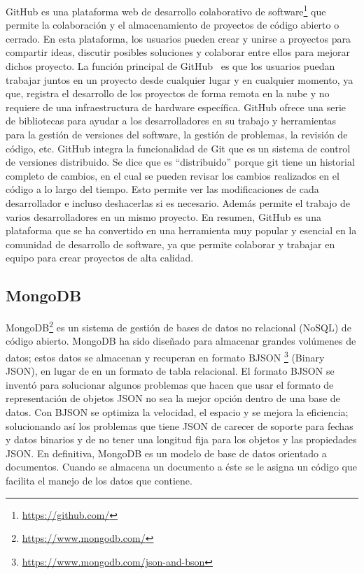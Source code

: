 \documentclass[a4paper, 12pt]{book}
\begin{document}
GitHub es una plataforma web de desarrollo colaborativo de software\footnote{\url{https://github.com/}} que permite la colaboración y el almacenamiento de proyectos de código abierto o cerrado.
En esta plataforma, los usuarios pueden crear y unirse a proyectos para compartir ideas, discutir posibles soluciones y colaborar entre ellos para mejorar dichos proyecto.
La función principal de GitHub~\cite{astigarraga2022se} es que los usuarios puedan trabajar juntos en un proyecto desde cualquier lugar y en cualquier momento, ya que, registra el desarrollo de los proyectos de forma remota en la nube y no requiere de una infraestructura de hardware específica.
GitHub ofrece una serie de bibliotecas para ayudar a los desarrolladores en su trabajo y herramientas para la gestión de versiones del software, la gestión de problemas, la revisión de código, etc. 
GitHub integra la funcionalidad de Git que es un sistema de control de versiones distribuido.
Se dice que es ``distribuido'' porque git tiene un historial completo de cambios, en el cual se pueden revisar los cambios realizados en el código a lo largo del tiempo. 
Esto permite ver las modificaciones de cada desarrollador e incluso deshacerlas si es necesario. Además permite el trabajo de varios desarrolladores en un mismo proyecto.
En resumen, GitHub es una plataforma que se ha convertido en una herramienta muy popular y esencial en la comunidad de desarrollo de software, ya que permite colaborar y trabajar en equipo para crear proyectos de alta calidad.
 

\subsection{MongoDB} %
\label{sec:mongodb} %

MongoDB\footnote{\url{https://www.mongodb.com/}} es un sistema de gestión de bases de datos no relacional (NoSQL) de código abierto. 
MongoDB ha sido diseñado para almacenar grandes volúmenes de datos; estos datos se almacenan y recuperan en formato BJSON \footnote{\url{https://www.mongodb.com/json-and-bson}} (Binary JSON), en lugar de en un formato de tabla relacional.
El formato BJSON se inventó para solucionar algunos problemas que hacen que usar el formato de representación de objetos JSON no sea la mejor opción dentro de una base de datos. 
Con BJSON se optimiza la velocidad, el espacio y se mejora la eficiencia; solucionando así los problemas que tiene JSON de carecer de soporte para fechas y datos binarios y de no tener una longitud fija para los objetos y las propiedades JSON.
En definitiva, MongoDB es un modelo de base de datos orientado a documentos. Cuando se almacena un documento a éste se le asigna un código que facilita el manejo de los datos que contiene.
\end{document}
